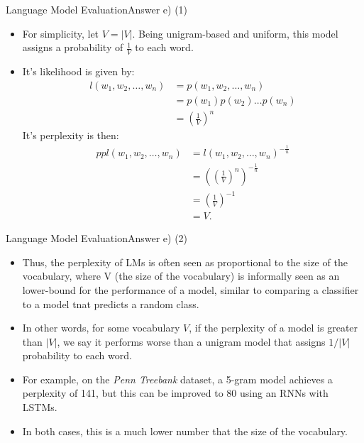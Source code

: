 \documentclass[t]{beamer}
\begin{document}
\begin{frame}{Language Model Evaluation}{Answer e) (1)}
    \begin{itemize}
        \item For simplicity, let $V = |V|$.
              Being unigram-based and uniform, this model assigns a probability
              of $\frac{1}{V}$ to each word.
        \item It's likelihood is given by:
              \begin{align*}
                  l(w_1,w_2,\ldots,w_n) & = p(w_1,w_2, \ldots, w_n)     \\
                                        & = p(w_1) p(w_2) \ldots p(w_n) \\
                                        & = \left(\frac{1}{V}\right)^n
              \end{align*}
              It's perplexity is then:
              \begin{align*}
                  ppl(w_1,w_2,\ldots,w_n) & = l(w_1,w_2,\ldots,w_n)^{-\frac{1}{n}}                   \\
                                          & = \left(\left(\frac{1}{V}\right)^n\right)^{-\frac{1}{n}} \\
                                          & = \left(\frac{1}{V}\right)^{-1}                          \\
                                          & = V.
              \end{align*}
    \end{itemize}
\end{frame}

\begin{frame}{Language Model Evaluation}{Answer e) (2)}
    \begin{itemize}
        \item Thus, the perplexity of LMs is often seen as proportional to the
              size of the vocabulary, where V (the size of the vocabulary) is
              informally seen as an lower-bound for the performance of a model,
              similar to comparing a classifier to a model tnat predicts a
              random class.
        \item In other words, for some vocabulary $V$, if the perplexity of a
              model is greater than $|V|$, we say it performs worse than a
              unigram model that assigns $1/|V|$ probability to each word.
        \item For example, on the \emph{Penn Treebank} dataset, a 5-gram model
              achieves a perplexity of 141, but this can be improved to 80 using
              an RNNs with LSTMs.
        \item In both cases, this is a much lower number that the size of the
              vocabulary.
    \end{itemize}
\end{frame}
\end{document}

